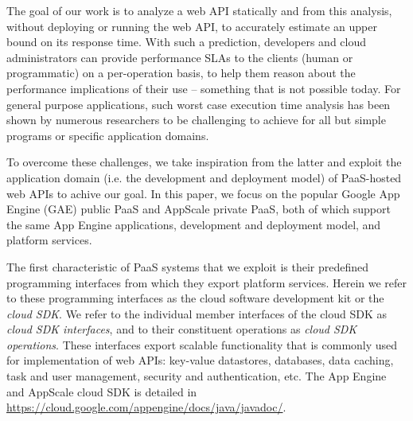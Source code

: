 The goal of our work is to analyze a web API statically and from this analysis, 
without deploying or running the web API, 
to accurately estimate an upper bound on its response time. With such a prediction,
developers and cloud administrators can provide performance SLAs to the clients (human or 
programmatic) on a per-operation basis, to help them reason about 
the performance implications of their use -- something that is not possible today.
For general purpose applications, such worst case execution time analysis has been shown
by numerous researchers to be challenging to achieve for all but 
simple programs or specific application domains.

To overcome these challenges, we take inspiration from the latter and exploit 
the application domain (i.e. the development and deployment
model) of PaaS-hosted web APIs to achive our goal.  
In this paper, we focus on the popular Google App Engine (GAE) public PaaS 
and AppScale private PaaS, both of which support the same App Engine applications, 
development and deployment model, and platform services.

The first characteristic of PaaS systems
that we exploit is their predefined programming interfaces 
from which they export platform services. 
Herein we refer to these programming interfaces as the cloud software development 
kit or the \textit{cloud SDK}. We refer to the individual member interfaces of the cloud SDK
as \textit{cloud SDK interfaces}, and to their constituent operations 
as \textit{cloud SDK operations}.  These interfaces export scalable
functionality that is commonly used for implementation of web APIs:  
key-value datastores, databases,
data caching, task and user management, security and authentication, etc.
The App Engine and AppScale cloud SDK is detailed 
in \url{https://cloud.google.com/appengine/docs/java/javadoc/}. 


